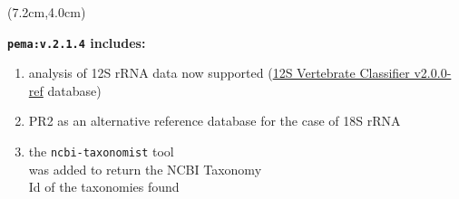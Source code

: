 \documentclass{beamer}
\begin{document}
\begin{frame}
\begin{singlespace}


         \begin{textblock*}{5cm}(7.2cm,4.0cm) %
            
            \scriptsize

            \textbf{\texttt{pema:v.2.1.4} includes:}

            \begin{enumerate}
               \item analysis of 12S rRNA data now supported
                     (\href{https://github.com/terrimporter/12SvertebrateClassifier/releases}{12S Vertebrate Classifier v2.0.0-ref} database) 
               \item PR2 as an alternative reference 
                     database for the case of 18S rRNA 
               \item the \texttt{ncbi-taxonomist} tool \\ 
                     was added to return the NCBI Taxonomy \\ 
                     Id of the taxonomies found
            \end{enumerate}
         \end{textblock*}
      \end{singlespace}


   \end{frame}
   \fi

   
   
\end{document}
